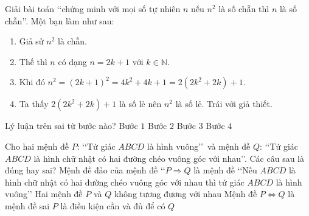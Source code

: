 \begin{ex}%
	Giải bài toán \lq\lq chứng minh với mọi số tự nhiên $n$ nếu $n^2$ là số chẵn  thì $n$ là số chẵn\rq\rq. Một bạn làm như sau:
	\begin{enumerate}[Bước 1.]
		\item Giả sử $n^2$  là chẵn.
		\item Thế thì $n$ có  dạng $n=2k+1$ với $k\in\mathbb{N}$.
		\item Khi đó  $n^2=(2k+1)^2=4k^2+4k+1=2(2k^2+2k)+1$.
		\item Ta thấy $2(2k^2+2k)+1$ là số lẻ nên $n^2$ là số lẻ. Trái với giả  thiết.
	\end{enumerate}
	Lý luận trên sai từ bước  nào?
	\choice 
		{\True Bước $1$} 
		 {Bước $2$}
		 {Bước $3$}
		{Bước $4$} 
\end{ex}



\begin{ex}%
	Cho hai mệnh đề $P$: \lq\lq Tứ giác $ABCD$ là hình vuông\rq\rq\ và mệnh đề $Q$: \lq\lq Tứ giác $ABCD$ là hình chữ nhật có hai đường chéo  vuông góc với nhau\rq\rq. Các câu sau là đúng hay sai?
	 \choiceTF
		{\True Mệnh đề đảo của mệnh đề \lq\lq $P \Rightarrow Q$ là mệnh đề \lq\lq Nếu $ABCD$ là hình chữ nhật có hai đường chéo vuông góc  với nhau thì tứ giác $ABCD$ là hình vuông\rq\rq}
		{Hai mệnh đề $P$ và $Q$ không tương đương  với nhau}
		{Mệnh đề $P \Leftrightarrow Q$ là  mệnh đề sai}
		{\True $P$ là điều  kiện cần và đủ để có $Q$}
\end{ex}

